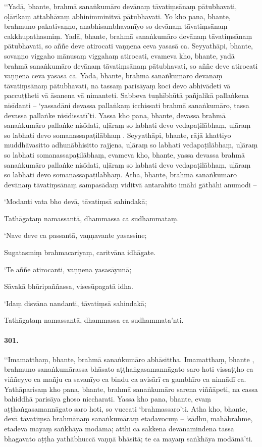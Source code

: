 ‘‘Yadā, bhante, brahmā sanaṅkumāro devānaṃ tāvatiṃsānaṃ pātubhavati, oḷārikaṃ attabhāvaṃ abhinimminitvā pātubhavati. Yo kho pana, bhante, brahmuno pakativaṇṇo, anabhisambhavanīyo so devānaṃ tāvatiṃsānaṃ cakkhupathasmiṃ. Yadā, bhante, brahmā sanaṅkumāro devānaṃ tāvatiṃsānaṃ pātubhavati, so aññe deve atirocati vaṇṇena ceva yasasā ca. Seyyathāpi, bhante, sovaṇṇo viggaho mānusaṃ viggahaṃ atirocati, evameva kho, bhante, yadā brahmā sanaṅkumāro devānaṃ tāvatiṃsānaṃ pātubhavati, so aññe deve atirocati vaṇṇena ceva yasasā ca. Yadā, bhante, brahmā sanaṅkumāro devānaṃ tāvatiṃsānaṃ pātubhavati, na tassaṃ parisāyaṃ koci devo abhivādeti vā paccuṭṭheti vā āsanena vā nimanteti. Sabbeva tuṇhībhūtā pañjalikā pallaṅkena nisīdanti – ‘yassadāni devassa pallaṅkaṃ icchissati brahmā sanaṅkumāro, tassa devassa pallaṅke nisīdissatī’ti. Yassa kho pana, bhante, devassa brahmā sanaṅkumāro pallaṅke nisīdati, uḷāraṃ so labhati devo vedapaṭilābhaṃ, uḷāraṃ so labhati devo somanassapaṭilābhaṃ . Seyyathāpi, bhante, rājā khattiyo muddhāvasitto adhunābhisitto rajjena, uḷāraṃ so labhati vedapaṭilābhaṃ, uḷāraṃ so labhati somanassapaṭilābhaṃ, evameva kho, bhante, yassa devassa brahmā sanaṅkumāro pallaṅke nisīdati, uḷāraṃ so labhati devo vedapaṭilābhaṃ, uḷāraṃ so labhati devo somanassapaṭilābhaṃ. Atha, bhante, brahmā sanaṅkumāro devānaṃ tāvatiṃsānaṃ sampasādaṃ viditvā antarahito imāhi gāthāhi anumodi –

‘Modanti vata bho devā, tāvatiṃsā sahindakā;

Tathāgataṃ namassantā, dhammassa ca sudhammataṃ.

‘Nave deve ca passantā, vaṇṇavante yasassine;

Sugatasmiṃ brahmacariyaṃ, caritvāna idhāgate.

‘Te aññe atirocanti, vaṇṇena yasasāyunā;

Sāvakā bhūripaññassa, visesūpagatā idha.

‘Idaṃ disvāna nandanti, tāvatiṃsā sahindakā;

Tathāgataṃ namassantā, dhammassa ca sudhammata’nti.

\paragraph{301.} ‘‘Imamatthaṃ, bhante, brahmā sanaṅkumāro abhāsittha. Imamatthaṃ, bhante , brahmuno sanaṅkumārassa bhāsato aṭṭhaṅgasamannāgato saro hoti vissaṭṭho ca viññeyyo ca mañju ca savanīyo ca bindu ca avisārī ca gambhīro ca ninnādī ca. Yathāparisaṃ kho pana, bhante, brahmā sanaṅkumāro sarena viññāpeti, na cassa bahiddhā parisāya ghoso niccharati. Yassa kho pana, bhante, evaṃ aṭṭhaṅgasamannāgato saro hoti, so vuccati ‘brahmassaro’ti. Atha kho, bhante, devā tāvatiṃsā brahmānaṃ sanaṅkumāraṃ etadavocuṃ – ‘sādhu, mahābrahme, etadeva mayaṃ saṅkhāya modāma; atthi ca sakkena devānamindena tassa bhagavato aṭṭha yathābhuccā vaṇṇā bhāsitā; te ca mayaṃ saṅkhāya modāmā’ti.

